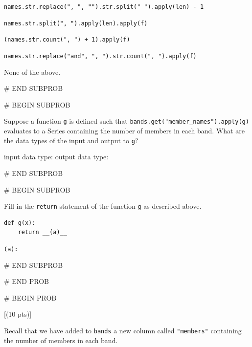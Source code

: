 \documentclass[twoside,12pt]{article}
\begin{document}
\smallskip
[ ] \texttt{names.str.replace(", ", "").str.split(" ").apply(len) - 1} 

\smallskip
[ ] \texttt{names.str.split(", ").apply(len).apply(f)} 

\smallskip
[ ] \texttt{(names.str.count(", ") + 1).apply(f)} 

\smallskip
[ ] \texttt{names.str.replace("and", ", ").str.count(", ").apply(f)} 

\smallskip
[ ] None of the above. 

    

# END SUBPROB

\bigskip

# BEGIN SUBPROB

 Suppose a function \texttt{g} is defined such that \texttt{bands.get("member\_names").apply(g)} evaluates to a Series containing the number of members in each band. What are the data types of the input and output to \texttt{g}?

\smallskip

\begin{center}    
input data type: 
\qquad
output data type:
\end{center}


# END SUBPROB

# BEGIN SUBPROB

  
Fill in the \texttt{return} statement of the function \texttt{g} as described above.
\begin{verbatim}
def g(x):
    return __(a)__
\end{verbatim}

\texttt{(a):} 


# END SUBPROB






# END PROB

\newpage
# BEGIN PROB

[(10 pts)]

Recall that we have added to \texttt{bands} a new column called \texttt{"members"} containing the number of members in each band.
\end{document}
